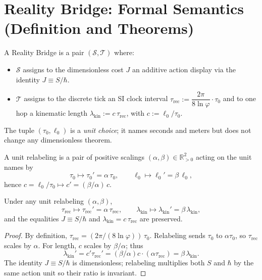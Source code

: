 \documentclass[11pt]{article}
\theoremstyle{plain}
\theoremstyle{definition}
\theoremstyle{remark}
\begin{document}
\section{Reality Bridge: Formal Semantics (Definition and Theorems)}

\begin{definition}
A Reality Bridge is a pair \((\mathcal{S},\mathcal{T})\) where:
\begin{itemize}
  \item \(\mathcal{S}\) assigns to the dimensionless cost \(J\) an additive action display via the identity \(J \equiv S/\hbar\).
  \item \(\mathcal{T}\) assigns to the discrete tick an SI clock interval \(\tau_{\mathrm{rec}} := \dfrac{2\pi}{8\ln\varphi}\cdot \tau_{0}\) and to one hop a kinematic length \(\lambda_{\mathrm{kin}} := c\,\tau_{\mathrm{rec}}\), with \(c:=\ell_{0}/\tau_{0}\).
\end{itemize}
The tuple \((\tau_{0},\ell_{0})\) is a \emph{unit choice}; it names seconds and meters but does not change any dimensionless theorem.
\end{definition}

\begin{definition}
A unit relabeling is a pair of positive scalings \((\alpha,\beta)\in\mathbb{R}_{>0}^2\) acting on the unit names by
\[
\tau_{0}\mapsto \tau_{0}'=\alpha\,\tau_{0},\qquad
\ell_{0}\mapsto \ell_{0}'=\beta\,\ell_{0},
\]
hence \(c=\ell_{0}/\tau_{0}\mapsto c'=(\beta/\alpha)\,c\).
\end{definition}

\begin{lemma}
Under any unit relabeling \((\alpha,\beta)\),
\[
\tau_{\mathrm{rec}}\mapsto \tau_{\mathrm{rec}}'=\alpha\,\tau_{\mathrm{rec}},\qquad
\lambda_{\mathrm{kin}}\mapsto \lambda_{\mathrm{kin}}'=\beta\,\lambda_{\mathrm{kin}},
\]
and the equalities \(J\equiv S/\hbar\) and \(\lambda_{\mathrm{kin}}=c\,\tau_{\mathrm{rec}}\) are preserved.
\end{lemma}

\begin{proof}
By definition, \(\tau_{\mathrm{rec}}=(2\pi/(8\ln\varphi))\,\tau_{0}\). Relabeling sends \(\tau_{0}\) to \(\alpha\tau_{0}\), so \(\tau_{\mathrm{rec}}\) scales by \(\alpha\). For length, \(c\) scales by \(\beta/\alpha\); thus
\[
\lambda_{\mathrm{kin}}'=c'\tau_{\mathrm{rec}}'=(\beta/\alpha)c\cdot(\alpha\tau_{\mathrm{rec}})=\beta\,\lambda_{\mathrm{kin}}.
\]
The identity \(J\equiv S/\hbar\) is dimensionless; relabeling multiplies both \(S\) and \(\hbar\) by the same action unit so their ratio is invariant.
\end{proof}
\end{document}
